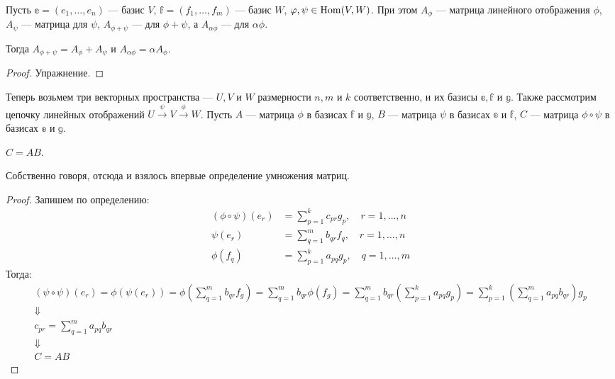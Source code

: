 \begin{Suggestion}
Пусть $\mathbb{e} = (e_1, \ldots, e_n)$ --- базис $V$, $\mathbb{f} = (f_1, \ldots, f_m)$ --- базис $W$, $\varphi, \psi \in \mathrm{Hom}(V, W)$. При этом $A_{\phi}$ --- матрица линейного отображения $\phi$, $A_{\psi}$ --- матрица для $\psi$, $A_{\phi+\psi}$ --- для $\phi + \psi$, а $A_{\alpha\phi}$ --- для $\alpha\phi$.

Тогда $A_{\phi+\psi} = A_{\phi} + A_{\psi}$ и $A_{\alpha\phi} = \alpha A_{\phi}$.
\end{Suggestion}
\begin{proof}
Упражнение.
\end{proof}

Теперь возьмем три векторных пространства --- $U, V$ и $W$ размерности $n, m$ и $k$ соответственно, и их базисы $\mathbb{e}, \mathbb{f}$ и $\mathbb{g}$. Также рассмотрим цепочку линейных отображений $U \xrightarrow{\psi} V \xrightarrow{\phi} W$. Пусть $A$ --- матрица $\phi$ в базисах $\mathbb{f}$ и $\mathbb{g}$, $B$ --- матрица $\psi$ в базисах $\mathbb{e}$ и $\mathbb{f}$, $C$ --- матрица $\phi\circ\psi$ в базисах $\mathbb{e}$ и $\mathbb{g}$.

\begin{Suggestion}
$C = AB$.
\end{Suggestion}
\begin{Comment}
Собственно говоря, отсюда и взялось впервые определение умножения матриц.
\end{Comment}
\begin{proof} Запишем по определению:
\begin{align*}
(\phi \circ \psi)(e_r) &= \sum_{p = 1}^{k}c_{pr}g_p, \quad r = 1, \ldots, n \\
\psi(e_r) &= \sum_{q = 1}^{m}b_{qr}f_q, \quad r = 1, \ldots, n \\
\phi(f_q) &= \sum_{p = 1}^{k}a_{pq}g_p, \quad q = 1, \ldots, m
\end{align*}
Тогда:
\begin{gather*}
(\psi\circ\psi)(e_r) = \phi(\psi(e_r)) = \phi\left(\sum_{q = 1}^{m}b_{qr}f_g \right) = \sum_{q = 1}^{m}b_{qr}\phi(f_g) = \sum_{q = 1}^{m}b_{qr}\left(\sum_{p = 1}^{k}a_{pq}g_p \right) = \sum_{p = 1}^{k}\left(\sum_{q = 1}^{m}a_{pq}b_{qr} \right)g_p \\
\Downarrow \\
c_{pr} = \sum_{q = 1}^{m}a_{pq}b_{qr} \\
\Downarrow\\
 C = AB
\end{gather*}
\end{proof}

